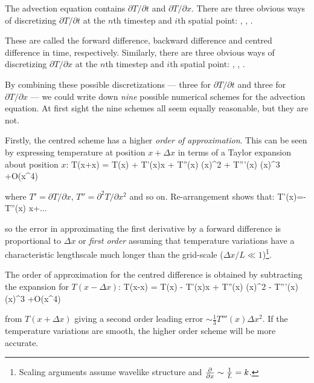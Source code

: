 The advection equation contains $\partial T / \partial t$ and
$\partial T / \partial x$. There are three obvious ways of
discretizing $\partial T / \partial t$ at the $n$th timestep and $i$th
spatial point:
\BEQ {} \;\;\; , \;\;\; 
 \;\;\; , \;\;\;
 . \EEQ

These are called the forward difference, backward difference and
centred difference in time, respectively.  Similarly, there are three
obvious ways of discretizing $\partial T / \partial x$ at the $n$th
timestep and $i$th spatial point:
\BEQ {} \;\;\; , \;\;\; 
 \;\;\; , \;\;\; 
 . \EEQ

By combining these possible discretizations --- three for $\partial T
/ \partial t$ and three for $\partial T / \partial x$ --- we could
write down \emph{nine} possible numerical schemes for the advection
equation.  At first sight the nine schemes all seem equally
reasonable, but they are not. 

Firstly, the centred scheme has a higher {\em order of
	approximation}. This can be seen by expressing temperature at position
$x+\Delta x$ in terms of a Taylor expansion about position $x$:
\BEQ T(x+\Delta x) = T(x) + T'(x)\Delta x +  T''(x) (\Delta x)^2 + 
 T'''(x) (\Delta x)^3 +O(\Delta x^4) \EEQ

where $T'=\partial T/\partial x$, $T''=\partial^2 T/\partial x^2$ and so on.
Re-arrangement shows that:
\BEQ
T'(x)=- T''(x) \Delta x+...
\EEQ

so the error in approximating the first derivative by a forward
difference is proportional to $\Delta x$ or {\em first order} assuming
that temperature variations have a characteristic lengthscale much
longer than the grid-scale ($\Delta x/L\ll 1$)\footnote{Scaling
	arguments assume wavelike structure and $\frac{\partial }{\partial x}\sim
	\frac{1}{L}=k$.}.

The order of approximation for the centred difference is obtained by subtracting the expansion for $T(x-\Delta x)$:
\BEQ T(x-\Delta x) = T(x) - T'(x)\Delta x +  T''(x) (\Delta x)^2 - 
 T'''(x) (\Delta x)^3 +O(\Delta x^4) \EEQ

from $T(x+\Delta x)$ giving a second order leading error $\sim
\frac{1}{3}T'''(x)\Delta x^2$. If the temperature variations are
smooth, the higher order scheme will be more accurate.

